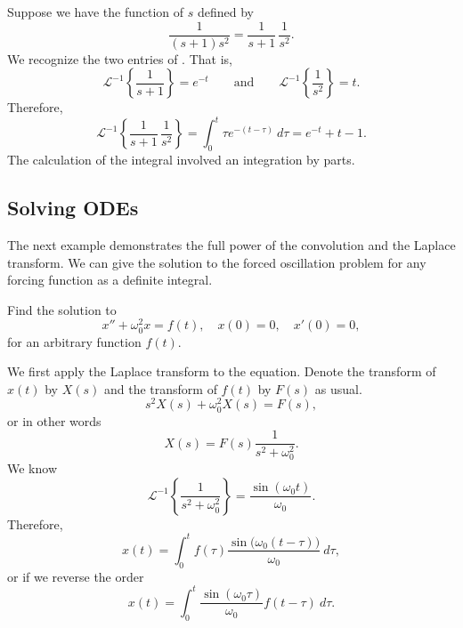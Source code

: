 \documentclass{ximera}
\begin{document}
\begin{example}
    Suppose we have the function of $s$ defined by
    \begin{equation*}
        \frac{1}{(s+1)s^2} = \frac{1}{s+1}\, \frac{1}{s^2} . 
    \end{equation*}
    We recognize the two entries of .  That is,
    \begin{equation*}
        \mathcal{L}^{-1} \left\{ \frac{1}{s+1} \right\} = e^{-t} \qquad \text{and} \qquad \mathcal{L}^{-1} \left\{ \frac{1}{s^2} \right\} = t.
    \end{equation*}
    Therefore,
    \begin{equation*}
        \mathcal{L}^{-1} \left\{ \frac{1}{s+1}\, \frac{1}{s^2} \right\} = \int_0^t \tau e^{-(t-\tau)} ~d\tau = e^{-t}+t-1 .
    \end{equation*}
    The calculation of the integral involved an integration by parts.
\end{example}

\subsection{Solving ODEs}

The next example demonstrates the full power of the convolution and the Laplace transform.  We can give the solution to the forced oscillation problem for any forcing function as a definite integral.

\begin{example}
    Find the solution to
    \begin{equation*}
        x'' + \omega_0^2 x = f(t) , \quad x(0) = 0, \quad x'(0) = 0 ,
    \end{equation*}
    for an arbitrary function $f(t)$.
\end{example}

\begin{exampleSol}
    We first apply the Laplace transform to the equation.  Denote the transform of $x(t)$ by $X(s)$ and the transform of $f(t)$ by $F(s)$ as usual.
    \begin{equation*}
        s^2 X(s) + \omega_0^2 X(s) = F(s) ,
    \end{equation*}
    or in other words
    \begin{equation*}
        X(s) = F(s) \frac{1}{s^2+ \omega_0^2} .
    \end{equation*}
    We know
    \begin{equation*}
        {\mathcal{L}}^{-1} \left\{ \frac{1}{s^2+ \omega_0^2} \right\} = \frac{\sin (\omega_0 t)}{\omega_0} .
    \end{equation*}
    Therefore,
    \begin{equation*}
        x(t) = \int_0^t f(\tau) \frac{\sin \bigl( \omega_0 (t-\tau) \bigr)}{\omega_0} ~ d\tau ,
    \end{equation*}
    or if we reverse the order
    \begin{equation*}
        x(t) = \int_0^t \frac{\sin (\omega_0 \tau)}{\omega_0} f(t-\tau) ~ d\tau .
    \end{equation*}
\end{exampleSol}
\end{document}
